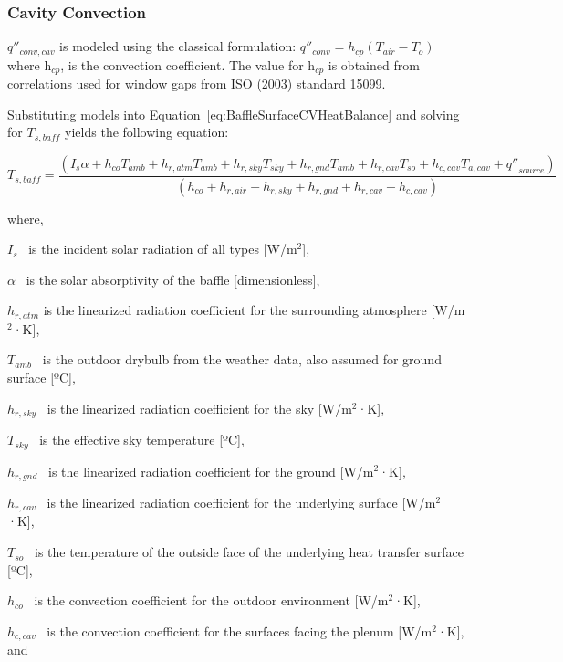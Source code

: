 \subsubsection{Cavity Convection}\label{cavity-convection}

\(q''_{conv,cav}\) is modeled using the classical formulation: \(q''_{conv} = h_{cp}(T_{air} - T_{o})\) where h\(_{cp}\), is the convection coefficient. The value for h\(_{cp}\) is obtained from correlations used for window gaps from ISO (2003) standard 15099.

Substituting models into Equation~\ref{eq:BaffleSurfaceCVHeatBalance} and solving for \({T_{s,baff}}\) yields the following equation:

\begin{equation}
{T_{s,baff}} = \frac{{\left( {{I_s}\alpha  + {h_{co}}{T_{amb}} + {h_{r,atm}}{T_{amb}} + {h_{r,sky}}{T_{sky}} + {h_{r,gnd}}{T_{amb}} + {h_{r,cav}}{T_{so}} + {h_{c,cav}}{T_{a,cav}} + {{q''}_{source}}} \right)}}{{\left( {{h_{co}} + {h_{r,air}} + {h_{r,sky}} + {h_{r,gnd}} + {h_{r,cav}} + {h_{c,cav}}} \right)}}
\end{equation}

where,

\({I_s}\) ~is the incident solar radiation of all types {[}W/m\(^{2}\){]},

\(\alpha\) ~is the solar absorptivity of the baffle {[}dimensionless{]},

\({h_{r,atm}}\) is the linearized radiation coefficient for the surrounding atmosphere {[}W/m\(^{2}\)·K{]},

\({T_{amb}}\) ~is the outdoor drybulb from the weather data, also assumed for ground surface {[}ºC{]},

\({h_{r,sky}}\) ~is the linearized radiation coefficient for the sky {[}W/m\(^{2}\)·K{]},

\({T_{sky}}\) ~is the effective sky temperature {[}ºC{]},

\({h_{r,gnd}}\) ~is the linearized radiation coefficient for the ground {[}W/m\(^{2}\)·K{]},

\({h_{r,cav}}\) ~is the linearized radiation coefficient for the underlying surface {[}W/m\(^{2}\)·K{]},

\({T_{so}}\) ~is the temperature of the outside face of the underlying heat transfer surface {[}ºC{]},

\({h_{co}}\) ~is the convection coefficient for the outdoor environment {[}W/m\(^{2}\)·K{]},

\({h_{c,cav}}\) ~is the convection coefficient for the surfaces facing the plenum {[}W/m\(^{2}\)·K{]}, and


